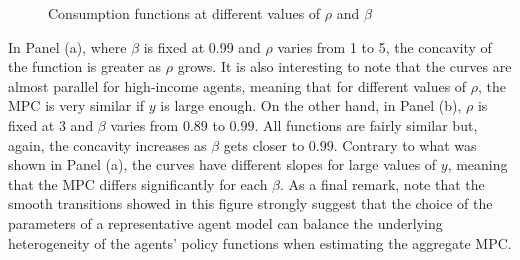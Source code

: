 \documentclass[english, a4paper, 12pt]{article}
\begin{document}
	\begin{figure}[H]
		\caption{Consumption functions at different values of $\rho$ and $\beta$} \label{fig:ConsRhoBeta}
		
		\hspace{0.02\textwidth}
		\vspace{-1ex}
	\end{figure}

In Panel (a), where $\beta$ is fixed at 0.99 and $\rho$ varies from 1 to 5, the concavity of the function is greater as $\rho$ grows. It is also interesting to note that the curves are almost parallel for high-income agents, meaning that for different values of $\rho$, the MPC is very similar if $y$ is large enough. On the other hand, in Panel (b), $\rho$ is fixed at 3 and $\beta$ varies from $0.89$ to $0.99$. All functions are fairly similar but, again, the concavity increases as $\beta$ gets closer to $0.99$. Contrary to what was shown in Panel (a), the curves have different slopes for large values of $y$, meaning that the MPC differs significantly for each $\beta$. As a final remark, note that the smooth transitions showed in this figure strongly suggest that the choice of the parameters of a representative agent model can balance the underlying heterogeneity of the agents' policy functions when estimating the aggregate MPC.
	
\end{document}
